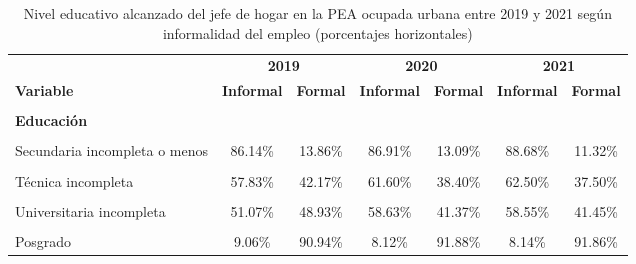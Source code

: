 \documentclass[
  letterpaper,
  12pt,
  oneside,
  spanish,
  doublespacing,
  headsepline,
  parskip]{MastersDoctoralThesis}
\begin{document}
\hypertarget{tbl-edu}{}
\begin{table}[H]
\caption{\label{tbl-edu}Nivel educativo alcanzado del jefe de hogar en la PEA ocupada urbana
entre 2019 y 2021 según informalidad del empleo (porcentajes
horizontales) }\tabularnewline

\centering\begingroup\fontsize{10}{12}\selectfont

\begin{tabular}{lcccccc}
\toprule
\multicolumn{1}{c}{ } & \multicolumn{2}{c}{\textbf{2019}} & \multicolumn{2}{c}{\textbf{2020}} & \multicolumn{2}{c}{\textbf{2021}} \\
\cmidrule(l{3pt}r{3pt}){2-3} \cmidrule(l{3pt}r{3pt}){4-5} \cmidrule(l{3pt}r{3pt}){6-7}
\textbf{Variable} & \textbf{Informal} & \textbf{Formal} & \textbf{Informal} & \textbf{Formal} & \textbf{Informal} & \textbf{Formal}\\
\midrule
\cellcolor{gray!6}{\textbf{Nacional}} & \cellcolor{gray!6}{62.98\%} & \cellcolor{gray!6}{37.02\%} & \cellcolor{gray!6}{66.17\%} & \cellcolor{gray!6}{33.83\%} & \cellcolor{gray!6}{68.45\%} & \cellcolor{gray!6}{31.55\%}\\
\textbf{Educación} &  &  &  &  &  & \\
\cellcolor{gray!6}{Sin nivel} & \cellcolor{gray!6}{92.71\%} & \cellcolor{gray!6}{7.29\%} & \cellcolor{gray!6}{93.52\%} & \cellcolor{gray!6}{6.48\%} & \cellcolor{gray!6}{95.58\%} & \cellcolor{gray!6}{4.42\%}\\
Secundaria incompleta o menos & 86.14\% & 13.86\% & 86.91\% & 13.09\% & 88.68\% & 11.32\%\\
\cellcolor{gray!6}{Secundaria completa} & \cellcolor{gray!6}{66.49\%} & \cellcolor{gray!6}{33.51\%} & \cellcolor{gray!6}{71.54\%} & \cellcolor{gray!6}{28.46\%} & \cellcolor{gray!6}{72.47\%} & \cellcolor{gray!6}{27.53\%}\\
\addlinespace
Técnica incompleta & 57.83\% & 42.17\% & 61.60\% & 38.40\% & 62.50\% & 37.50\%\\
\cellcolor{gray!6}{Técnica completa} & \cellcolor{gray!6}{39.25\%} & \cellcolor{gray!6}{60.75\%} & \cellcolor{gray!6}{38.92\%} & \cellcolor{gray!6}{61.08\%} & \cellcolor{gray!6}{42.80\%} & \cellcolor{gray!6}{57.20\%}\\
Universitaria incompleta & 51.07\% & 48.93\% & 58.63\% & 41.37\% & 58.55\% & 41.45\%\\
\cellcolor{gray!6}{Universitaria completa} & \cellcolor{gray!6}{25.03\%} & \cellcolor{gray!6}{74.97\%} & \cellcolor{gray!6}{24.89\%} & \cellcolor{gray!6}{75.11\%} & \cellcolor{gray!6}{26.88\%} & \cellcolor{gray!6}{73.12\%}\\
Posgrado & 9.06\% & 90.94\% & 8.12\% & 91.88\% & 8.14\% & 91.86\%\\
\bottomrule
\end{tabular}
\endgroup{}
\end{table}
\end{document}
